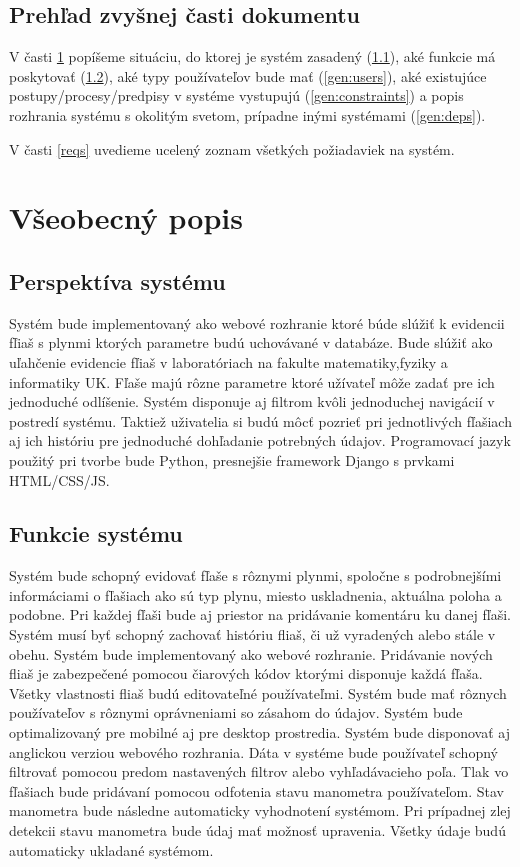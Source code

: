 \documentclass[hreffootnote]{zah}
\begin{document}
\subsection{Prehľad zvyšnej časti dokumentu}

V časti \ref{general} popíšeme situáciu, do ktorej je systém zasadený (\ref{gen:perspective}), aké funkcie má poskytovať (\ref{gen:functions}), aké typy používateľov bude mať (\ref{gen:users}), aké existujúce postupy/procesy/predpisy v systéme vystupujú (\ref{gen:constraints}) a popis rozhrania systému s okolitým svetom, prípadne inými systémami (\ref{gen:deps}).

V časti \ref{reqs} uvedieme ucelený zoznam všetkých požiadaviek na systém.

\cleardoublepage
\section{Všeobecný popis}
\label{general}

\subsection{Perspektíva systému}
\label{gen:perspective}
Systém bude implementovaný ako webové rozhranie ktoré búde slúžiť k evidencii fľiaš s plynmi ktorých parametre budú uchovávané v databáze. Bude slúžiť ako uľahčenie evidencie fľiaš v laboratóriach na fakulte matematiky,fyziky a informatiky UK. Fľaše majú rôzne parametre ktoré užívateľ môže zadať pre ich jednoduché odlíšenie. Systém disponuje aj filtrom  kvôli jednoduchej navigácií v postredí systému. Taktiež uživatelia si budú môcť pozrieť pri jednotlivých fľašiach aj ich históriu pre jednoduché dohľadanie potrebných údajov. Programovací jazyk použitý pri tvorbe bude Python, presnejšie framework Django s prvkami HTML/CSS/JS.

\subsection{Funkcie systému}
\label{gen:functions}
Systém bude schopný evidovať fľaše s rôznymi plynmi, spoločne s podrobnejšími informáciami o fľašiach ako sú typ plynu, miesto uskladnenia, aktuálna poloha a podobne. Pri každej fľaši bude aj priestor na pridávanie komentáru ku danej fľaši. Systém musí byť schopný zachovať históriu fliaš, či už vyradených alebo stále v obehu. Systém bude implementovaný ako webové rozhranie. Pridávanie nových fliaš je zabezpečené pomocou čiarových kódov ktorými disponuje každá fľaša. Všetky vlastnosti fliaš budú editovateľné používateľmi. Systém bude mať rôznych používateľov s rôznymi oprávneniami so zásahom do údajov. Systém bude optimalizovaný pre mobilné aj pre desktop prostredia. Systém bude disponovať aj anglickou verziou webového rozhrania. Dáta v systéme bude používateľ schopný filtrovať pomocou predom nastavených filtrov alebo vyhľadávacieho poľa. Tlak vo fľašiach bude pridávaní pomocou odfotenia stavu manometra používateľom. Stav manometra bude následne automaticky vyhodnotení systémom. Pri prípadnej zlej detekcii stavu manometra bude údaj mať možnosť upravenia. Všetky údaje budú automaticky ukladané systémom.
\end{document}
